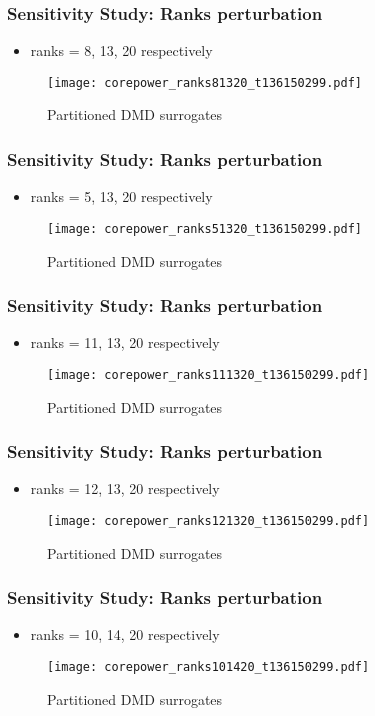 \documentclass[fleqn]{beamer}
\begin{document}
\begin{frame}
\frametitle{Sensitivity Study: Ranks perturbation}
\begin{itemize}
 \item ranks = 8, 13, 20 respectively
\end{itemize}
\begin{figure}[ht]
\texttt{[image: corepower\_ranks81320\_t136150299.pdf]}
\caption{Partitioned DMD surrogates}
\end{figure}
\end{frame}

\begin{frame}
\frametitle{Sensitivity Study: Ranks perturbation}
\begin{itemize}
 \item ranks = 5, 13, 20 respectively
\end{itemize}

\begin{figure}[ht]

\texttt{[image: corepower\_ranks51320\_t136150299.pdf]}
\caption{Partitioned DMD surrogates}
\end{figure}
\end{frame}

\begin{frame}
\frametitle{Sensitivity Study: Ranks perturbation}
\begin{itemize}
 \item ranks = 11, 13, 20 respectively
\end{itemize}
\begin{figure}[ht]
\texttt{[image: corepower\_ranks111320\_t136150299.pdf]}
\caption{Partitioned DMD surrogates}
\end{figure}
\end{frame}

\begin{frame}
\frametitle{Sensitivity Study: Ranks perturbation}
\begin{itemize}
 \item ranks = 12, 13, 20 respectively
\end{itemize}

\begin{figure}[ht]

\texttt{[image: corepower\_ranks121320\_t136150299.pdf]}
\caption{Partitioned DMD surrogates}
\end{figure}
\end{frame}

\begin{frame}
\frametitle{Sensitivity Study: Ranks perturbation}
\begin{itemize}
 \item ranks = 10, 14, 20 respectively
\end{itemize}
\begin{figure}[ht]
\texttt{[image: corepower\_ranks101420\_t136150299.pdf]}
\caption{Partitioned DMD surrogates}
\end{figure}
\end{frame}
\end{document}
